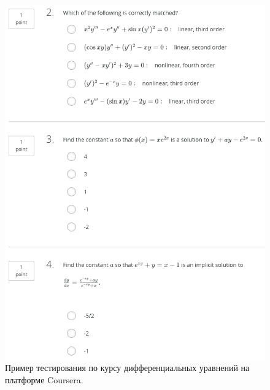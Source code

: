 \documentclass[14pt,russian]{extarticle}
\begin{document}
\begin{figure}[h!]
	\centering
		\includegraphics[height=.4\textheight]{img/Coursera/pic3.png}
	\caption{Пример тестирования по курсу дифференциальных уравнений на платформе Coursera.}
	\label{img:Coursera:2}
\end{figure}


\end{document}
